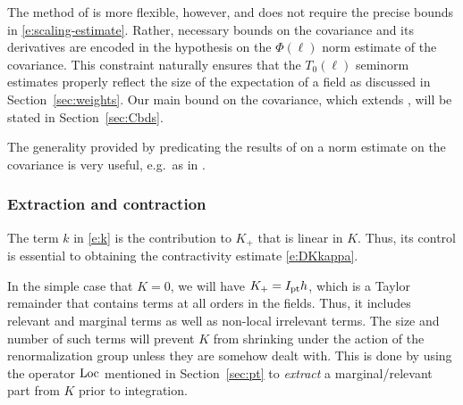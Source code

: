 The method of \cite{BS-rg-IE} is more flexible, however, and does not require
the precise bounds in \eqref{e:scaling-estimate}. Rather, necessary bounds on
the covariance and its derivatives are encoded in the hypothesis
\cite[\eqref{IE-e:CLbd}]{BS-rg-IE} on the $\Phi(\ell)$
norm estimate of the covariance. This constraint naturally ensures that the $T_0(\ell)$
seminorm estimates properly reflect the size of the expectation of a field as discussed
in Section~\ref{sec:weights}.
Our main bound on the covariance, which extends \cite[\eqref{IE-e:CLbd}]{BS-rg-IE},
will be stated in Section~\ref{sec:Cbds}.

\begin{rk}
The generality provided by predicating the results of \cite{BS-rg-IE} on a
norm estimate on the covariance is very useful, e.g.\ as in \cite{Slad17}.
\end{rk}

\subsubsection{Extraction and contraction}

The term $k$ in \eqref{e:k} is the contribution to $K_+$ that is linear in
$K$. Thus, its control is essential to obtaining the contractivity estimate
\eqref{e:DKkappa}.

In the simple case that $K = 0$, we will have $K_+ = I_{\rm pt} h$, which is a Taylor
remainder that contains terms at all orders in the fields. Thus, it includes
relevant and marginal terms as well as non-local irrelevant terms. The size and
number of such terms will prevent $K$ from shrinking under the action of the
renormalization group unless they are somehow dealt with. This is done by using
the operator $\operatorname{Loc}$ mentioned in Section~\ref{sec:pt} to \emph{extract} a
marginal/relevant part from $K$ prior to integration.


